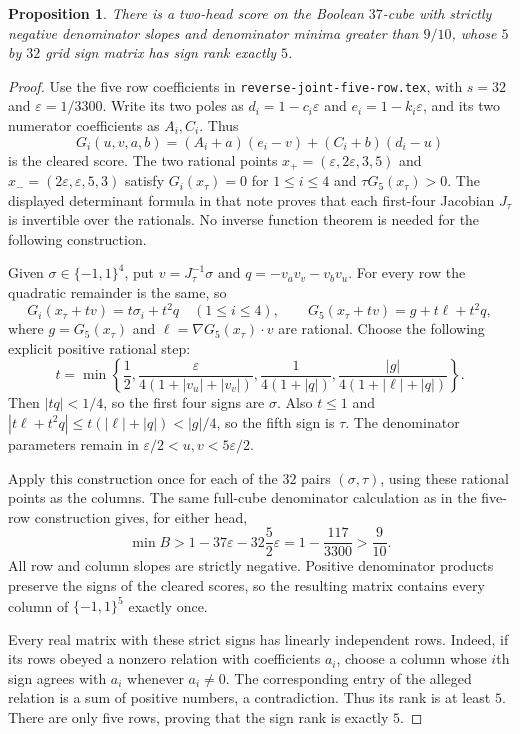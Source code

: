 \documentclass[11pt]{article}
\newtheorem{proposition}{Proposition}
\begin{document}
\begin{proposition}
There is a two-head score on the Boolean $37$-cube with strictly negative
denominator slopes and denominator minima greater than $9/10$, whose
$5$ by $32$ grid sign matrix has sign rank exactly $5$.
\end{proposition}
\begin{proof}
Use the five row coefficients in
\texttt{reverse-joint-five-row.tex}, with $s=32$ and
$\varepsilon=1/3300$. Write its two poles as
$d_i=1-c_i\varepsilon$ and $e_i=1-k_i\varepsilon$, and its two numerator
coefficients as $A_i,C_i$. Thus
\[
 G_i(u,v,a,b)=(A_i+a)(e_i-v)+(C_i+b)(d_i-u)
\]
is the cleared score. The two rational points
$x_+=(\varepsilon,2\varepsilon,3,5)$ and
$x_-=(2\varepsilon,\varepsilon,5,3)$ satisfy $G_i(x_\tau)=0$ for
$1\leq i\leq4$ and $\tau G_5(x_\tau)>0$.
The displayed determinant formula in that note proves that each first-four
Jacobian $J_\tau$ is invertible over the rationals. No inverse function
theorem is needed for the following construction.

Given $\sigma\in\{-1,1\}^4$, put
$v=J_\tau^{-1}\sigma$ and $q=-v_a v_v-v_b v_u$.
For every row the quadratic remainder is the same, so
\[
 G_i(x_\tau+t v)=t\sigma_i+t^2q\quad(1\leq i\leq4),
 \qquad
 G_5(x_\tau+t v)=g+t\ell+t^2q,
\]
where $g=G_5(x_\tau)$ and
$\ell=\nabla G_5(x_\tau)\cdot v$ are rational.
Choose the following explicit positive rational step:
\[
 t=\min\left\{
 \frac12,
 \frac{\varepsilon}{4(1+|v_u|+|v_v|)},
 \frac1{4(1+|q|)},
 \frac{|g|}{4(1+|\ell|+|q|)}
 \right\}.
\]
Then $|tq|<1/4$, so the first four signs are $\sigma$.
Also $t\leq1$ and
$|t\ell+t^2q|\leq t(|\ell|+|q|)<|g|/4$, so the fifth sign is
$\tau$. The denominator parameters remain in
$\varepsilon/2<u,v<5\varepsilon/2$.

Apply this construction once for each of the $32$ pairs $(\sigma,\tau)$,
using these rational points as the columns. The same full-cube denominator
calculation as in the five-row construction gives, for either head,
\[
 \min B>1-37\varepsilon-32\frac52\varepsilon
 =1-\frac{117}{3300}>\frac9{10}.
\]
All row and column slopes are strictly negative. Positive denominator
products preserve the signs of the cleared scores, so the resulting
matrix contains every column of $\{-1,1\}^5$ exactly once.

Every real matrix with these strict signs has linearly independent rows.
Indeed, if its rows obeyed a nonzero relation with coefficients $a_i$,
choose a column whose $i$th sign agrees with $a_i$ whenever $a_i\neq0$.
The corresponding entry of the alleged relation is a sum of positive
numbers, a contradiction. Thus its rank is at least $5$. There are only
five rows, proving that the sign rank is exactly $5$.
\end{proof}
\end{document}
